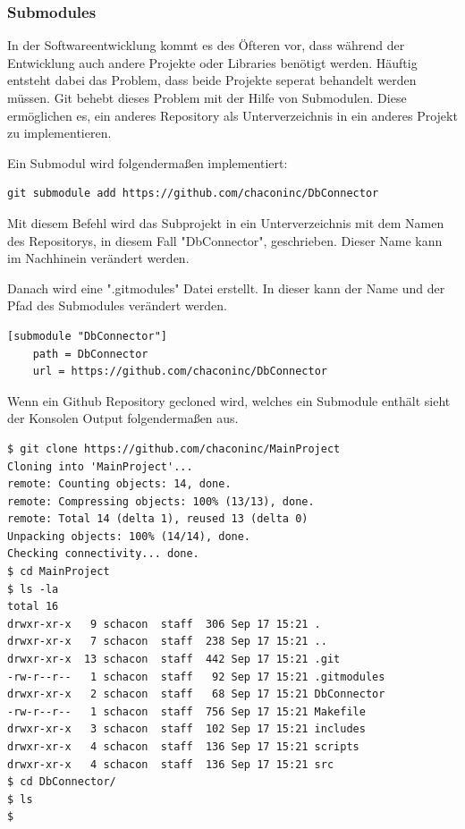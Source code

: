 \subsubsection{Submodules}

In der Softwareentwicklung kommt es des Öfteren vor, dass während der Entwicklung auch andere Projekte oder Libraries benötigt werden. Häuftig entsteht dabei das Problem, dass beide Projekte seperat behandelt werden müssen. Git behebt dieses Problem mit der Hilfe von Submodulen. Diese ermöglichen es, ein anderes Repository als Unterverzeichnis in ein anderes Projekt zu implementieren.

Ein Submodul wird folgendermaßen implementiert:

\begin{lstlisting}
git submodule add https://github.com/chaconinc/DbConnector
\end{lstlisting}

Mit diesem Befehl wird das Subprojekt in ein Unterverzeichnis mit dem Namen des Repositorys, in diesem Fall "DbConnector", geschrieben. Dieser Name kann im Nachhinein verändert werden.

Danach wird eine ".gitmodules" Datei erstellt. In dieser kann der Name und der Pfad des Submodules verändert werden.
\begin{lstlisting}
[submodule "DbConnector"]
	path = DbConnector
	url = https://github.com/chaconinc/DbConnector
\end{lstlisting}
\newpage
Wenn ein Github Repository gecloned wird, welches ein Submodule enthält sieht der Konsolen Output folgendermaßen aus. 
\begin{lstlisting}[caption=GIT Consolen Output]
$ git clone https://github.com/chaconinc/MainProject
Cloning into 'MainProject'...
remote: Counting objects: 14, done.
remote: Compressing objects: 100% (13/13), done.
remote: Total 14 (delta 1), reused 13 (delta 0)
Unpacking objects: 100% (14/14), done.
Checking connectivity... done.
$ cd MainProject
$ ls -la
total 16
drwxr-xr-x   9 schacon  staff  306 Sep 17 15:21 .
drwxr-xr-x   7 schacon  staff  238 Sep 17 15:21 ..
drwxr-xr-x  13 schacon  staff  442 Sep 17 15:21 .git
-rw-r--r--   1 schacon  staff   92 Sep 17 15:21 .gitmodules
drwxr-xr-x   2 schacon  staff   68 Sep 17 15:21 DbConnector
-rw-r--r--   1 schacon  staff  756 Sep 17 15:21 Makefile
drwxr-xr-x   3 schacon  staff  102 Sep 17 15:21 includes
drwxr-xr-x   4 schacon  staff  136 Sep 17 15:21 scripts
drwxr-xr-x   4 schacon  staff  136 Sep 17 15:21 src
$ cd DbConnector/
$ ls
$
\end{lstlisting}

